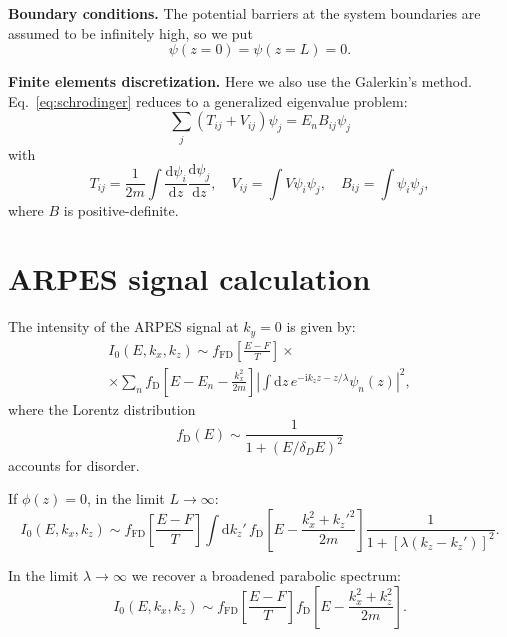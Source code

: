 \documentclass[10pt]{article}
\newcommand{\dd}{\mathrm{d}}
\newcommand{\ii}{\mathrm{i}}
\begin{document}
\textbf{Boundary conditions.} The potential barriers at the system
boundaries are assumed to be infinitely high, so we put
\begin{equation}
	\psi(z = 0) = \psi(z = L) = 0.
\end{equation}

\textbf{Finite elements discretization.} Here we also use the Galerkin's
method. Eq.~\eqref{eq:schrodinger} reduces to a generalized eigenvalue problem:
\begin{equation}
	\sum_j \left( T_{ij} + V_{ij} \right) \psi_j = E_n B_{ij} \psi_j
\end{equation}
with
\begin{equation}
	T_{ij} = \frac{1}{2m }\int \frac{\dd \psi_i}{\dd z} \frac{\dd \psi_j}{\dd z},
	\quad
	V_{ij} = \int V \psi_i \psi_j, \quad B_{ij} = \int \psi_i \psi_j,
\end{equation}
where $B$ is positive-definite.

\section{ARPES signal calculation}

The intensity of the ARPES signal at $k_y = 0$ is given by:
\begin{multline}
	I_0(E, k_x, k_z) \sim f_{\mathrm{FD}}\left[ \frac{E - F}{T} \right] \times\\
		\times \sum_n f_{\mathrm{D}}\left[ E - E_n - \frac{k_x^2}{2m} \right]
		\left\vert \int \dd z \, e^{-\ii k_z z - z / \lambda}
		\psi_n(z) \right\vert^2,
\end{multline}
where the Lorentz distribution
\begin{equation}
	f_{\mathrm{D}}(E) \sim \frac{1}{1 + (E / \delta_D E)^2}
\end{equation}
accounts for disorder.

If $\phi(z) = 0$, in the limit $L \to \infty$:
\begin{equation}
	I_0(E, k_x, k_z) \sim f_{\mathrm{FD}}\left[ \frac{E - F}{T} \right]
		\int \dd k_z' \, f_{\mathrm{D}}\left[ E - \frac{k_x^2 + k_z'^2}{2m} \right]
		\frac{1}{1 + [\lambda (k_z - k_z')]^2}.
\end{equation}

In the limit $\lambda \to \infty$ we recover a broadened parabolic spectrum:
\begin{equation}
	I_0(E, k_x, k_z) \sim f_{\mathrm{FD}}\left[ \frac{E - F}{T} \right]
		f_{\mathrm{D}}\left[ E - \frac{k_x^2 + k_z^2}{2m} \right].
\end{equation}
\end{document}
